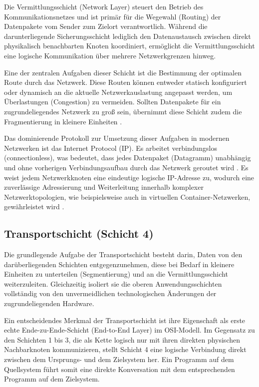 Die Vermittlungsschicht (Network Layer) steuert den Betrieb des Kommunikationsnetzes und ist primär für die Wegewahl (Routing) der Datenpakete vom Sender zum Zielort verantwortlich. Während die darunterliegende Sicherungsschicht lediglich den Datenaustausch zwischen direkt physikalisch benachbarten Knoten koordiniert, ermöglicht die Vermittlungsschicht eine logische Kommunikation über mehrere Netzwerkgrenzen hinweg. 

Eine der zentralen Aufgaben dieser Schicht ist die Bestimmung der optimalen Route durch das Netzwerk. Diese Routen können entweder statisch konfiguriert oder dynamisch an die aktuelle Netzwerkauslastung angepasst werden, um Überlastungen (Congestion) zu vermeiden. Sollten Datenpakete für ein zugrundeliegendes Netzwerk zu groß sein, übernimmt diese Schicht zudem die Fragmentierung in kleinere Einheiten .

Das dominierende Protokoll zur Umsetzung dieser Aufgaben in modernen Netzwerken ist das Internet Protocol (IP). Es arbeitet verbindungslos (connectionless), was bedeutet, dass jedes Datenpaket (Datagramm) unabhängig und ohne vorherigen Verbindungsaufbau durch das Netzwerk geroutet wird . Es weist jedem Netzwerkknoten eine eindeutige logische IP-Adresse zu, wodurch eine zuverlässige Adressierung und Weiterleitung innerhalb komplexer Netzwerktopologien, wie beispielsweise auch in virtuellen Container-Netzwerken, gewährleistet wird   .

\subsection{Transportschicht (Schicht 4)}

Die grundlegende Aufgabe der Transportschicht besteht darin, Daten von den darüberliegenden Schichten entgegenzunehmen, diese bei Bedarf in kleinere Einheiten zu unterteilen (Segmentierung) und an die Vermittlungsschicht weiterzuleiten. Gleichzeitig isoliert sie die oberen Anwendungsschichten vollständig von den unvermeidlichen technologischen Änderungen der zugrundeliegenden Hardware.

Ein entscheidendes Merkmal der Transportschicht ist ihre Eigenschaft als erste echte Ende-zu-Ende-Schicht (End-to-End Layer) im \ac{OSI}-Modell. Im Gegensatz zu den Schichten 1 bis 3, die als Kette logisch nur mit ihren direkten physischen Nachbarknoten kommunizieren, stellt Schicht 4 eine logische Verbindung direkt zwischen dem Ursprungs- und dem Zielsystem her. Ein Programm auf dem Quellsystem führt somit eine direkte Konversation mit dem entsprechenden Programm auf dem Zielsystem.


